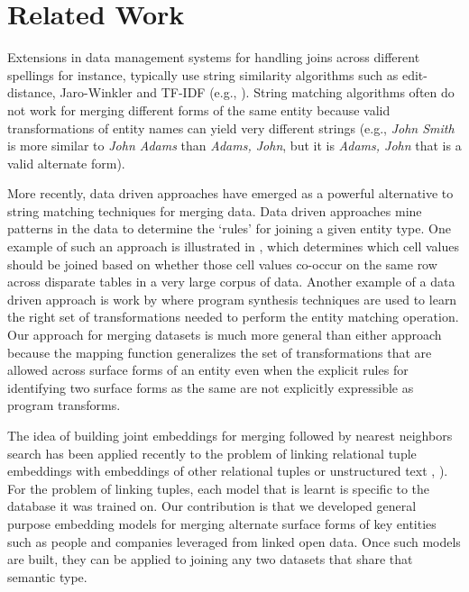 \section{Related Work}
Extensions in data management systems for handling joins across different spellings for instance, typically use string similarity algorithms such as edit-distance, Jaro-Winkler and TF-IDF (e.g., \cite{Cohen2003}).  String matching algorithms often do not work for merging different forms of the same entity because valid transformations of entity names can yield very different strings (e.g., \textit{John Smith} is more similar to \textit{John Adams} than \textit{Adams, John}, but it is \textit{Adams, John} that is a valid alternate form).

More recently, data driven approaches have emerged as a powerful alternative to string matching techniques for merging data.  Data driven approaches mine patterns in the data to determine the `rules' for joining a given entity type.  One example of such an approach is illustrated in \cite{He:2015:SJS:2824032.2824036}, which determines which cell values should be joined based on whether those cell values co-occur on the same row across disparate tables in a very large corpus of data.  Another example of a data driven approach is work by \cite{auto-join-joining-tables-leveraging-transformations} where program synthesis techniques are used to learn the right set of transformations needed to perform the entity matching operation.  Our approach for merging datasets is much more general than either approach because the mapping function generalizes the set of transformations that are allowed across surface forms of an entity even when the explicit rules for identifying two surface forms as the same are not explicitly expressible as program transforms.

The idea of building joint embeddings for merging followed by nearest neighbors search has been applied recently to the problem of linking relational tuple embeddings with embeddings of other relational tuples or unstructured text \cite{Bordawekar18}, \cite{IDEL18}).  For the problem of linking tuples, each model that is learnt is specific to the database it was trained on.  Our contribution is that we developed general purpose embedding models for merging alternate surface forms of key entities such as people and companies leveraged from linked open data.  Once such models are built, they can be applied to joining any two datasets that share that semantic type.

